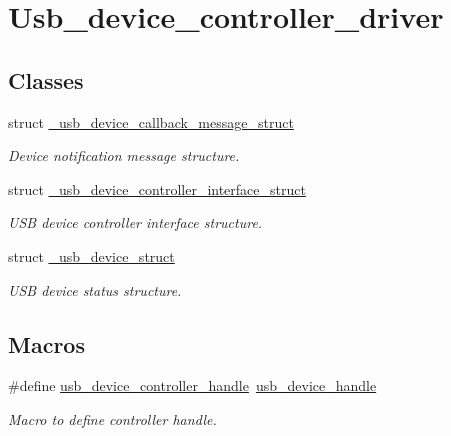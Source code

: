 \hypertarget{group__usb__device__controller__driver}{\section{Usb\-\_\-device\-\_\-controller\-\_\-driver}
\label{group__usb__device__controller__driver}
}
\subsection*{Classes}
\begin{DoxyCompactItemize}
\item 
struct \hyperlink{struct__usb__device__callback__message__struct}{\-\_\-usb\-\_\-device\-\_\-callback\-\_\-message\-\_\-struct}
\begin{DoxyCompactList}\small\item\em Device notification message structure. \end{DoxyCompactList}\item 
struct \hyperlink{struct__usb__device__controller__interface__struct}{\-\_\-usb\-\_\-device\-\_\-controller\-\_\-interface\-\_\-struct}
\begin{DoxyCompactList}\small\item\em U\-S\-B device controller interface structure. \end{DoxyCompactList}\item 
struct \hyperlink{struct__usb__device__struct}{\-\_\-usb\-\_\-device\-\_\-struct}
\begin{DoxyCompactList}\small\item\em U\-S\-B device status structure. \end{DoxyCompactList}\end{DoxyCompactItemize}
\subsection*{Macros}
\begin{DoxyCompactItemize}
\item 
\#define \hyperlink{group__usb__device__controller__driver_gaec03ce2e4732aa876cd2a91cf8e93b5b}{usb\-\_\-device\-\_\-controller\-\_\-handle}~\hyperlink{group__usb__drv_gae62132dc6e5eba994f8aa56cb7399abc}{usb\-\_\-device\-\_\-handle}
\begin{DoxyCompactList}\small\item\em Macro to define controller handle. \end{DoxyCompactList}\end{DoxyCompactItemize}
